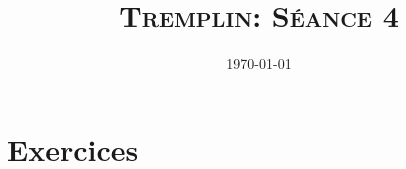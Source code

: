 \documentclass[12pt]{article}
\title{\textsc{Tremplin: Séance 4}}
\date{\today}
\author{}
\theoremstyle{definition}
\begin{document}
	
\maketitle

\section*{Exercices}
\end{document}
